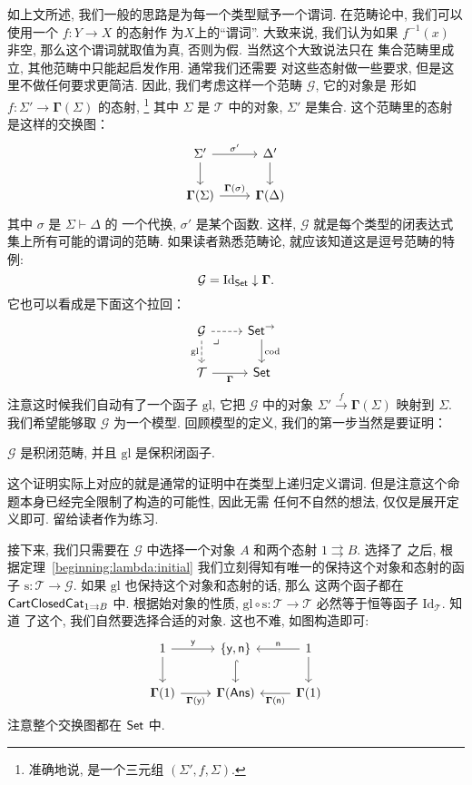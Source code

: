 如上文所述, 我们一般的思路是为每一个类型赋予一个谓词.
在范畴论中, 我们可以使用一个 \(f : Y \to X\) 的态射作
为\(X\)上的“谓词”. 大致来说, 我们认为如果 \(f^{-1}(x)\) 非空,
那么这个谓词就取值为真, 否则为假. 当然这个大致说法只在
集合范畴里成立, 其他范畴中只能起启发作用. 通常我们还需要
对这些态射做一些要求, 但是这里不做任何要求更简洁. 因此,
我们考虑这样一个范畴 \(\mathcal G\), 它的对象是
形如 \(f:\Sigma' \to \boldsymbol\Gamma(\Sigma)\) 的态射,%
\footnote{准确地说, 是一个三元组 \((\Sigma', f, \Sigma)\).}
其中 \(\Sigma\) 是 \(\mathcal T\) 中的对象, \(\Sigma'\)
是集合. 这个范畴里的态射是这样的交换图：
\[
\begin{tikzcd}
\Sigma' \ar[r, "\sigma'"] \ar[d] & \Delta' \ar[d] \\
\boldsymbol\Gamma(\Sigma) \ar[r, "\boldsymbol\Gamma(\sigma)"] & \boldsymbol\Gamma(\Delta)
\end{tikzcd}
\]
其中 \(\sigma\) 是 \(\Sigma \vdash \Delta\) 的
一个代换, \(\sigma'\) 是某个函数. 这样, \(\mathcal G\)
就是每个类型的闭表达式集上所有可能的谓词的范畴.
如果读者熟悉范畴论, 就应该知道这是逗号范畴的特例:
\[\mathcal G = \mathrm{Id}_{\textsf{Set}}\downarrow \boldsymbol\Gamma.\]
它也可以看成是下面这个拉回：
\[
\begin{tikzcd}
\mathcal G \ar[r, dashed] \ar[d, dashed, "\mathrm{gl}"'] \ar[dr, phantom, "\lrcorner", very near start] & \cons{Set}^{\to} \ar[d, "\mathrm{cod}"] \\
\mathcal T \ar[r, "\boldsymbol\Gamma"'] & \cons{Set}
\end{tikzcd}
\]
注意这时候我们自动有了一个函子 \(\mathrm{gl}\), 它把
\(\mathcal G\) 中的对象 \(\Sigma' \xrightarrow f \boldsymbol\Gamma(\Sigma)\)
映射到 \(\Sigma\). 我们希望能够取 \(\mathcal G\)
为一个模型. 回顾模型的定义, 我们的第一步当然是要证明：
\begin{lemma}
\(\mathcal G\) 是积闭范畴, 并且 \(\mathrm{gl}\)
是保积闭函子.
\end{lemma}
这个证明实际上对应的就是通常的证明中在类型上递归定义谓词.
但是注意这个命题本身已经完全限制了构造的可能性, 因此无需
任何不自然的想法, 仅仅是展开定义即可. 留给读者作为练习.

接下来, 我们只需要在 \(\mathcal G\) 中选择一个对象
\(A\) 和两个态射 \(1 \rightrightarrows B\). 选择了
之后, 根据定理~\ref{beginning:lambda:initial}
我们立刻得知有唯一的保持这个对象和态射的函子
\(\mathrm{s}:\mathcal T \to \mathcal G\).
如果 \(\mathrm{gl}\) 也保持这个对象和态射的话, 那么
这两个函子都在 \(\textsf{CartClosedCat}_{1\rightrightarrows B}\)
中. 根据始对象的性质, \(\mathrm{gl} \circ \mathrm{s} : \mathcal T \to \mathcal T\)
必然等于恒等函子 \(\mathrm{Id}_{\mathcal T}\). 知道
了这个, 我们自然要选择合适的对象. 这也不难, 如图构造即可:
\[
\begin{tikzcd}
1 \ar[r, "\cons{y}"] \ar[d] & \{\cons{y}, \cons{n}\} \ar[d, hook] & \ar[l, "\cons{n}"'] 1 \ar[d] \\
\boldsymbol\Gamma(1) \ar[r, "\boldsymbol\Gamma(\cons{y})"'] & \boldsymbol\Gamma(\cons{Ans}) &\ar[l, "\boldsymbol\Gamma(\cons{n})"] \boldsymbol\Gamma(1)
\end{tikzcd}
\]
注意整个交换图都在 \(\textsf{Set}\) 中.

